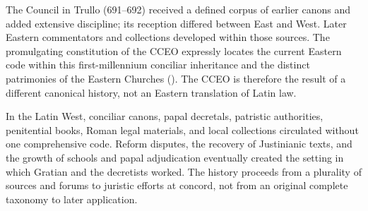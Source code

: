 The Council in Trullo (691--692) received a defined corpus of earlier canons and added extensive discipline; its reception differed between East and West. Later Eastern commentators and collections developed within those sources. The promulgating constitution of the CCEO expressly locates the current Eastern code within this first-millennium conciliar inheritance and the distinct patrimonies of the Eastern Churches (). The CCEO is therefore the result of a different canonical history, not an Eastern translation of Latin law.

In the Latin West, conciliar canons, papal decretals, patristic authorities, penitential books, Roman legal materials, and local collections circulated without one comprehensive code. Reform disputes, the recovery of Justinianic texts, and the growth of schools and papal adjudication eventually created the setting in which Gratian and the decretists worked. The history proceeds from a plurality of sources and forums to juristic efforts at concord, not from an original complete taxonomy to later application.
